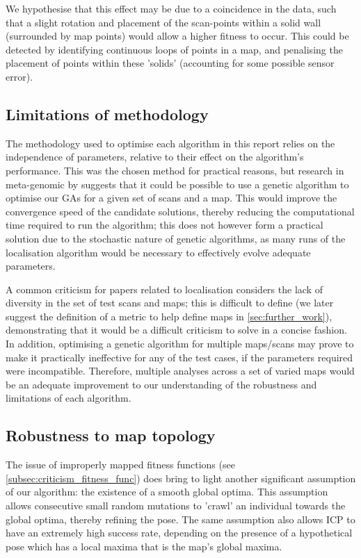 \documentclass[authoryearcitations]{UoYCSproject}
\begin{document}
We hypothesise that this effect may be due to a coincidence in the data, such that a slight rotation and placement of the scan-points within a solid wall (surrounded by map points) would allow a higher fitness to occur. This could be detected by identifying continuous loops of points in a map, and penalising the placement of points within these 'solids' (accounting for some possible sensor error).

\subsection{Limitations of methodology}
The methodology used to optimise each algorithm in this report relies on the independence of parameters, relative to their effect on the algorithm's performance. This was the chosen method for practical reasons, but research in meta-genomic by \citet{Brain2011-pz} suggests that it could be possible to use a genetic algorithm to optimise our GAs for a given set of scans and a map. This would improve the convergence speed of the candidate solutions, thereby reducing the computational time required to run the algorithm; this does not however form a practical solution due to the stochastic nature of genetic algorithms, as many runs of the localisation algorithm would be necessary to effectively evolve adequate parameters. 

A common criticism for papers related to localisation considers the lack of diversity in the set of test scans and maps; this is difficult to define (we later suggest the definition of a metric to help define maps in \autoref{sec:further_work}), demonstrating that it would be a difficult criticism to solve in a concise fashion. In addition, optimising a genetic algorithm for multiple maps/scans may prove to make it practically ineffective for any of the test cases, if the parameters required were incompatible. Therefore, multiple analyses across a set of varied maps would be an adequate improvement to our understanding of the robustness and limitations of each algorithm.

\subsection{Robustness to map topology}
\label{subsec:robustness_to_map_topology}
The issue of improperly mapped fitness functions (see \autoref{subsec:criticism_fitness_func}) does bring to light another significant assumption of our algorithm: the existence of a smooth global optima. This assumption allows consecutive small random mutations to 'crawl' an individual towards the global optima, thereby refining the pose. The same assumption also allows ICP to have an extremely high success rate, depending on the presence of a hypothetical pose which has a local maxima that is the map's global maxima. 
\end{document}
